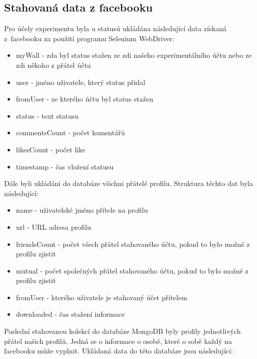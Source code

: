 \documentclass[thesis=M,czech]{FITthesis}[2013/05/10]
\begin{document}
\subsection{Stahovaná data z facebooku}

Pro účely experimentu byla u statusů ukládána následující data získaná z~facebooku za použití programu Selenium WebDriver:

\begin{itemize}
  \item myWall - zda byl status stažen ze zdi našeho experimentálního účtu nebo ze zdi někoho z přátel účtu
  \item user - jméno uživatele, který status přidal
  \item fromUser - ze kterého účtu byl status stažen  
  \item status - text statusu
  \item commentsCount - počet komentářů
  \item likesCount - počet like
  \item timestamp - čas vložení statusu
\end{itemize}

Dále byli ukládáni do databáze všichni přátelé profilu. Struktura těchto dat byla následující:

\begin{itemize}
  \item name - uživatelské jméno přítele na profilu
  \item url - URL adresa profilu
  \item friendsCount - počet všech přátel stahovaného účtu, pokud to bylo možné z profilu zjistit
  \item mutual - počet společných přátel stahovaného účtu, pokud to bylo možné z profilu zjistit
  \item fromUser - kterého uživatele je stahovaný účet přítelem
  \item downloaded - čas stažení informace
\end{itemize}

Poslední stahovanou kolekcí do databáze MongoDB byly profily jednotlivých přátel našich profilů. Jedná se o informace o osobě, které o sobě každý na facebooku může vyplnit. Ukládaná data do této databáze jsou následující:
\end{document}
